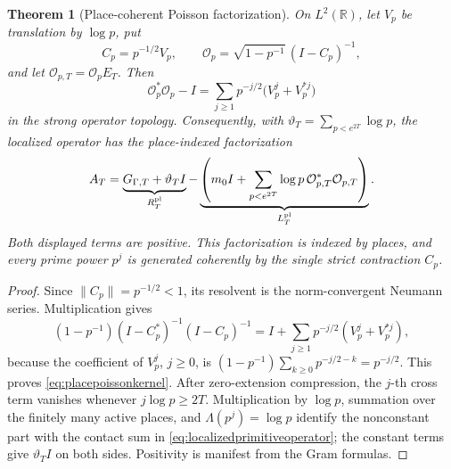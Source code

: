 \documentclass[11pt]{amsart}
\newtheorem{theorem}{Theorem}[section]
\theoremstyle{definition}
\theoremstyle{remark}
\begin{document}
\begin{theorem}[Place-coherent Poisson factorization]
\label{thm:placepoissonfactorization}
On $L^2(\mathbb R)$, let $V_p$ be translation by \(\log p\), put
\[
 C_p=p^{-1/2}V_p,
 \qquad
 \mathcal O_p=\sqrt{1-p^{-1}}\,(I-C_p)^{-1},
\]
and let \(\mathcal O_{p,T}=\mathcal O_pE_T\).  Then
\begin{equation}\label{eq:placepoissonkernel}
 \mathcal O_p^*\mathcal O_p-I
 =\sum_{j\ge1}p^{-j/2}
       \bigl(V_p^j+V_p^{*j}\bigr)
\end{equation}
in the strong operator topology.  Consequently, with
\(\vartheta_T=\sum_{p<e^{2T}}\log p\), the localized operator has the
place-indexed factorization
\begin{equation}\label{eq:placepoissonfactorization}
 A_T=\underbrace{G_{\Gamma,T}+\vartheta_TI}_{R_T^{\rm pl}}
 -\underbrace{\left(m_0I+
   \sum_{p<e^{2T}}\log p\,
     \mathcal O_{p,T}^*\mathcal O_{p,T}\right)}_{L_T^{\rm pl}}.
\end{equation}
Both displayed terms are positive.  This factorization is indexed by places,
and every prime power $p^j$ is generated coherently by the single strict
contraction $C_p$.
\end{theorem}

\begin{proof}
Since \(\|C_p\|=p^{-1/2}<1\), its resolvent is the norm-convergent
Neumann series.  Multiplication gives
\[
 (1-p^{-1})(I-C_p^*)^{-1}(I-C_p)^{-1}
 =I+\sum_{j\ge1}p^{-j/2}(V_p^j+V_p^{*j}),
\]
because the coefficient of $V_p^j$, $j\ge0$, is
\((1-p^{-1})\sum_{k\ge0}p^{-j/2-k}=p^{-j/2}\).
This proves \eqref{eq:placepoissonkernel}.  After zero-extension compression,
the $j$-th cross term vanishes whenever $j\log p\ge2T$.  Multiplication
by \(\log p\), summation over the finitely many active places, and
\(\Lambda(p^j)=\log p\) identify the nonconstant part with the contact
sum in \eqref{eq:localizedprimitiveoperator}; the constant terms give
\(\vartheta_TI\) on both sides.  Positivity is manifest from the Gram
formulas.
\end{proof}
\end{document}
